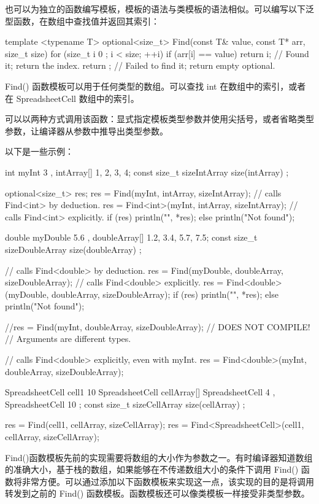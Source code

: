 
也可以为独立的函数编写模板，模板的语法与类模板的语法相似。可以编写以下泛型函数，在数组中查找值并返回其索引：

\begin{cpp}
template <typename T>
optional<size_t> Find(const T& value, const T* arr, size_t size)
{
    for (size_t i { 0 }; i < size; ++i) {
        if (arr[i] == value) {
            return i; // Found it; return the index.
        }
    }
    return {}; // Failed to find it; return empty optional.
}
\end{cpp}

Find() 函数模板可以用于任何类型的数组。可以查找 int 在数组中的索引，或者在 SpreadsheetCell 数组中的索引。

可以以两种方式调用该函数：显式指定模板类型参数并使用尖括号，或者省略类型参数，让编译器从参数中推导出类型参数。

以下是一些示例：

\begin{cpp}
int myInt { 3 }, intArray[] {1, 2, 3, 4};
const size_t sizeIntArray { size(intArray) };

optional<size_t> res;
res = Find(myInt, intArray, sizeIntArray); // calls Find<int> by deduction.
res = Find<int>(myInt, intArray, sizeIntArray); // calls Find<int> explicitly.
if (res) { println("{}", *res); }
else { println("Not found"); }

double myDouble { 5.6 }, doubleArray[] {1.2, 3.4, 5.7, 7.5};
const size_t sizeDoubleArray { size(doubleArray) };

// calls Find<double> by deduction.
res = Find(myDouble, doubleArray, sizeDoubleArray);
// calls Find<double> explicitly.
res = Find<double>(myDouble, doubleArray, sizeDoubleArray);
if (res) { println("{}", *res); }
else { println("Not found"); }

//res = Find(myInt, doubleArray, sizeDoubleArray); // DOES NOT COMPILE!
                                                // Arguments are different types.

// calls Find<double> explicitly, even with myInt.
res = Find<double>(myInt, doubleArray, sizeDoubleArray);

SpreadsheetCell cell1 { 10 }
SpreadsheetCell cellArray[] { SpreadsheetCell { 4 }, SpreadsheetCell { 10 } };
const size_t sizeCellArray { size(cellArray) };

res = Find(cell1, cellArray, sizeCellArray);
res = Find<SpreadsheetCell>(cell1, cellArray, sizeCellArray);
\end{cpp}

Find()函数模板先前的实现需要将数组的大小作为参数之一。有时编译器知道数组的准确大小，基于栈的数组，如果能够在不传递数组大小的条件下调用 Find() 函数将非常方便。可以通过添加以下函数模板来实现这一点，该实现的目的是将调用转发到之前的 Find() 函数模板。函数模板还可以像类模板一样接受非类型参数。


